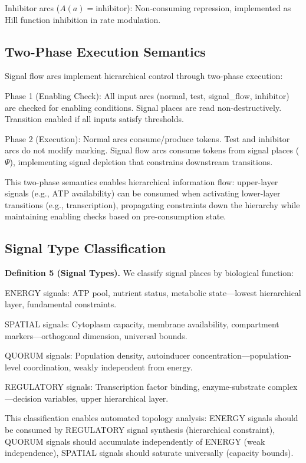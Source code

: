 \documentclass[twocolumn,11pt]{article}
\begin{document}
Inhibitor arcs ($A(a) = \text{inhibitor}$): Non-consuming repression, implemented as Hill function inhibition in rate modulation.

\subsection{Two-Phase Execution Semantics}

Signal flow arcs implement hierarchical control through two-phase execution:

Phase 1 (Enabling Check): All input arcs (normal, test, signal\_flow, inhibitor) are checked for enabling conditions. Signal places are read non-destructively. Transition enabled if all inputs satisfy thresholds.

Phase 2 (Execution): Normal arcs consume/produce tokens. Test and inhibitor arcs do not modify marking. Signal flow arcs consume tokens from signal places ($\Psi$), implementing signal depletion that constrains downstream transitions.

This two-phase semantics enables hierarchical information flow: upper-layer signals (e.g., ATP availability) can be consumed when activating lower-layer transitions (e.g., transcription), propagating constraints down the hierarchy while maintaining enabling checks based on pre-consumption state.

\subsection{Signal Type Classification}

\textbf{Definition 5 (Signal Types).} We classify signal places by biological function:

ENERGY signals: ATP pool, nutrient status, metabolic state---lowest hierarchical layer, fundamental constraints.

SPATIAL signals: Cytoplasm capacity, membrane availability, compartment markers---orthogonal dimension, universal bounds.

QUORUM signals: Population density, autoinducer concentration---population-level coordination, weakly independent from energy.

REGULATORY signals: Transcription factor binding, enzyme-substrate complex---decision variables, upper hierarchical layer.

This classification enables automated topology analysis: ENERGY signals should be consumed by REGULATORY signal synthesis (hierarchical constraint), QUORUM signals should accumulate independently of ENERGY (weak independence), SPATIAL signals should saturate universally (capacity bounds).
\end{document}
